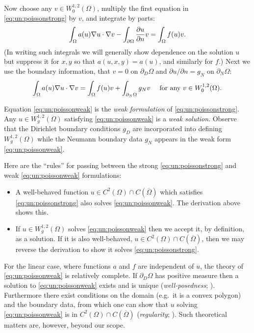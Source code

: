 Now choose any $v\in W^{1,2}_0(\Omega)$, multiply the first equation in \eqref{eq:un:poissonstrong} by $v$, and integrate by parts:
\begin{equation*}
\int_\Omega a(u) \nabla u \cdot \nabla v - \int_{\partial\Omega} \frac{\partial u}{\partial n} v = \int_\Omega f(u) v.
\end{equation*}
(In writing such integrals we will generally show dependence on the solution $u$ but suppress it for $x,y$ so that $a(u,x,y)=a(u)$, and similarly for $f$.)  Next we use the boundary information, that $v=0$ on $\partial_D\Omega$ and $\partial u/\partial n=g_N$ on $\partial_N\Omega$:
\begin{equation}
\int_\Omega a(u) \nabla u \cdot \nabla v = \int_\Omega f(u) v + \int_{\partial_N\Omega} g_N v\quad \text{ for any } v\in W^{1,2}_0(\Omega). \label{eq:un:poissonweak}
\end{equation}

Equation \eqref{eq:un:poissonweak} is the \emph{weak formulation} of \eqref{eq:un:poissonstrong}.  Any $u \in W^{1,2}_g(\Omega)$ satisfying \eqref{eq:un:poissonweak} is a \emph{weak solution}.  Observe that the Dirichlet boundary conditions $g_D$ are incorporated into defining $W^{1,2}_g(\Omega)$ while the Neumann boundary data $g_N$ appears in the weak form \eqref{eq:un:poissonweak}.

Here are the ``rules'' for passing between the strong \eqref{eq:un:poissonstrong} and weak \eqref{eq:un:poissonweak} formulations:\begin{itemize}
\item A well-behaved function $u \in C^2(\Omega) \cap C(\overline \Omega)$ which satisfies \eqref{eq:un:poissonstrong} also solves \eqref{eq:un:poissonweak}.  The derivation above shows this.
\item If $u \in W^{1,2}_g(\Omega)$ solves \eqref{eq:un:poissonweak} then we accept it, by definition, as a solution.   If it is also well-behaved, $u \in C^2(\Omega) \cap C(\overline \Omega)$, then we may reverse the derivation to show it solves \eqref{eq:un:poissonstrong}.
\end{itemize}

For the linear case, where functions $a$ and $f$ are independent of $u$, the theory of \eqref{eq:un:poissonweak} is relatively complete.  If $\partial_D \Omega$ has positive measure then a solution to \eqref{eq:un:poissonweak} exists and is unique (\emph{well-posedness}; \citep{Ciarlet2002,Evans2010}).  Furthermore there exist conditions on the domain (e.g.~it is a convex polygon) and the boundary data, from which one can show that $u$ solving \eqref{eq:un:poissonweak} is in $C^2(\Omega) \cap C(\overline \Omega)$ (\emph{regularity}; \citep{Evans2010}).  Such theoretical matters are, however, beyond our scope.

